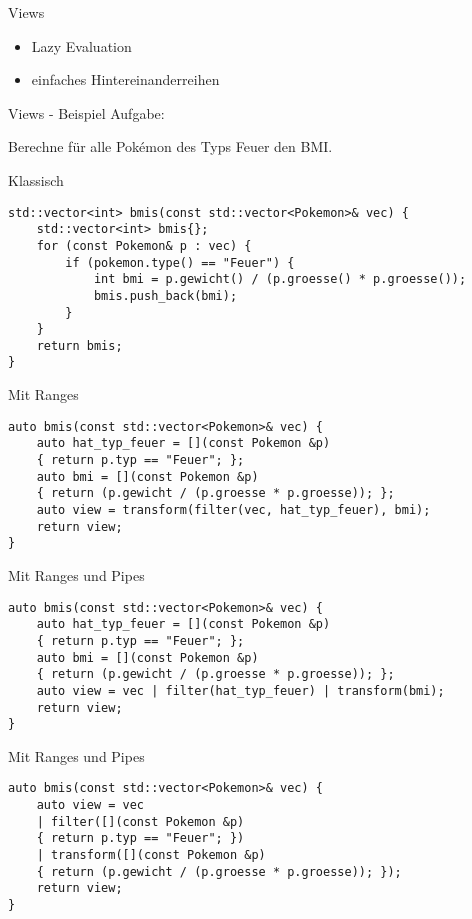 \begin{frame}{Views}
\begin{itemize}
    \item Lazy Evaluation
    \item einfaches Hintereinanderreihen
\end{itemize}
\end{frame}

\begin{frame}{Views - Beispiel}
Aufgabe:

Berechne für alle Pokémon des Typs Feuer den BMI.
\end{frame}

\begin{frame}[fragile]{Klassisch}
\begin{verbatim}
std::vector<int> bmis(const std::vector<Pokemon>& vec) {
    std::vector<int> bmis{};
    for (const Pokemon& p : vec) {
        if (pokemon.type() == "Feuer") {
            int bmi = p.gewicht() / (p.groesse() * p.groesse());
            bmis.push_back(bmi);
        }
    }
    return bmis;
}
\end{verbatim}
\end{frame} 

\begin{frame}[fragile]{Mit Ranges}
\begin{verbatim}
auto bmis(const std::vector<Pokemon>& vec) {
    auto hat_typ_feuer = [](const Pokemon &p)
    { return p.typ == "Feuer"; };
    auto bmi = [](const Pokemon &p)
    { return (p.gewicht / (p.groesse * p.groesse)); };
    auto view = transform(filter(vec, hat_typ_feuer), bmi);
    return view;
}
\end{verbatim}
\end{frame}

\begin{frame}[fragile]{Mit Ranges und Pipes}
    \begin{verbatim}
auto bmis(const std::vector<Pokemon>& vec) {
    auto hat_typ_feuer = [](const Pokemon &p)
    { return p.typ == "Feuer"; };
    auto bmi = [](const Pokemon &p)
    { return (p.gewicht / (p.groesse * p.groesse)); };
    auto view = vec | filter(hat_typ_feuer) | transform(bmi);
    return view;
}
\end{verbatim}
\end{frame}

\begin{frame}[fragile]{Mit Ranges und Pipes}
    \begin{verbatim}
auto bmis(const std::vector<Pokemon>& vec) {
    auto view = vec
    | filter([](const Pokemon &p)
    { return p.typ == "Feuer"; })
    | transform([](const Pokemon &p)
    { return (p.gewicht / (p.groesse * p.groesse)); });
    return view;
}
\end{verbatim}
\end{frame}



